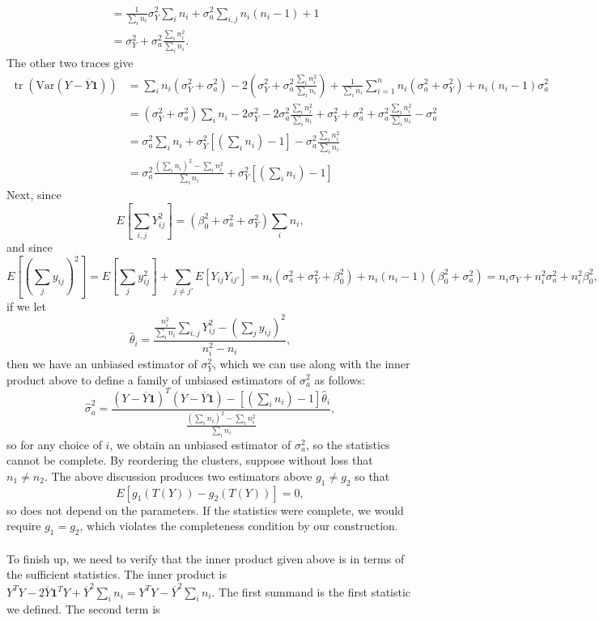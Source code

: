 \documentclass[11pt]{article}
\newcommand{\Var}{\mathrm{Var}}
\newcommand{\tr}{\operatorname{tr}}
\begin{document}
\begin{enumerate}
\begin{align*}
		&= \frac{1}{\sum_i n_i}\sigma_Y^2 \sum_i n_i  + \sigma^2_a \sum_{i,j} n_i(n_i-1) + 1 \\
		&= \sigma_Y^2 + \sigma_a^2 \frac{\sum_i n_i^2}{\sum_i n_i}.
\	\end{align*}
The other two traces give
	\begin{align*}
		\tr(\Var(Y-\overline{Y}\bm{1})) &= \sum_i n_i(\sigma^2_Y + \sigma^2_a) -2(\sigma_Y^2 + \sigma_a^2 \frac{\sum_i n_i^2}{\sum_i n_i}) + \frac{1}{\sum_i n_i} \sum_{i=1}^n n_i(\sigma_a^2+\sigma_Y^2) + n_i(n_i-1)\sigma_a^2 \\
		&= (\sigma^2_Y + \sigma^2_a)\sum_i n_i - 2\sigma^2_Y - 2\sigma^2_a \frac{\sum_i n_i^2}{\sum_i n_i} + \sigma_Y^2 + \sigma_a^2 + \sigma^2_a\frac{\sum_i n_i^2}{\sum_i n_i} - \sigma_a^2 \\
		&= \sigma_a^2\sum_i n_i + \sigma_Y^2[(\sum_i n_i) - 1] -\sigma_a^2 \frac{\sum_i n_i^2}{\sum_i n_i} \\
		&= \sigma_a^2 \frac{(\sum_i n_i)^2 - \sum_i n_i^2}{\sum_i n_i} + \sigma_Y^2[(\sum_i n_i) - 1]
	\end{align*}
	Next, since 
	\[
		E[\sum_{i,j}Y_{ij}^2]=(\beta_0^2 + \sigma_a^2 + \sigma_Y^2)\sum_i n_i,
	\] and since 
	\[
		E[(\sum_j y_{ij})^2] = E[\sum_j y_{ij}^2] + \sum_{j\neq j'}E[Y_{ij}Y_{ij'}] = n_i(\sigma_a^2 + \sigma_Y^2 + \beta_0^2) + n_i(n_i-1)(\beta_0^2 + \sigma_a^2) = n_i\sigma_Y + n_i^2 \sigma_a^2 + n_i^2 \beta_0^2,
	\] if we let
	\[
		\widehat{\theta}_i = \frac{\frac{n_i^2}{\sum_i n_i} \sum_{i,j}Y_{ij}^2-(\sum_j y_{ij})^2}{n_i^2-n_i},
	\]
	then we have an unbiased estimator of $\sigma_Y^2$, which we can use along with the inner product above to define a family of unbiased estimators of $\sigma_a^2$ as follows:
	\[
		\widehat{\sigma}_a^2 = \frac{(Y-\overline{Y}\bm{1})^T(Y-\overline{Y}\bm{1}) - [(\sum_i n_i) - 1]\widehat{\theta}_i}{\frac{(\sum_i n_i)^2 - \sum_i n_i^2}{\sum_i n_i}},
	\]
	so for any choice of $i$, we obtain an unbiased estimator of $\sigma^2_a$, so the statistics cannot be complete. By reordering the clusters, suppose without loss that $n_1\neq n_2$. The above discussion produces two estimators above $g_1\neq g_2$ so that
	\[
		E[g_1(T(Y))-g_2(T(Y))] = 0,
	\]
	so does not depend on the parameters. If the statistics were complete, we would require $g_1= g_2$, which violates the completeness condition by our construction.
	\\ \\
	To finish up, we need to verify that the inner product given above is in terms of the sufficient statistics. The inner product is $Y^TY - 2\overline{Y}\bm{1}^TY + \overline{Y}^2\sum_i n_i = Y^TY - \overline{Y}^2 \sum_i n_i$. The first summand is the first statistic we defined. The second term is

\end{enumerate}
\end{document}
